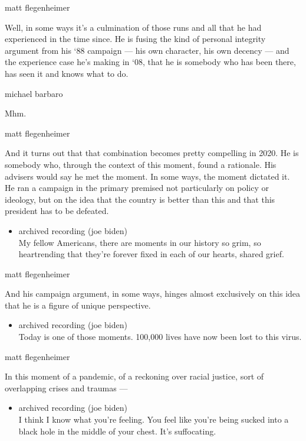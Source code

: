 matt flegenheimer

Well, in some ways it's a culmination of those runs and all that he had
experienced in the time since. He is fusing the kind of personal
integrity argument from his `88 campaign --- his own character, his own
decency --- and the experience case he's making in `08, that he is
somebody who has been there, has seen it and knows what to do.

michael barbaro

Mhm.

matt flegenheimer

And it turns out that that combination becomes pretty compelling in
2020. He is somebody who, through the context of this moment, found a
rationale. His advisers would say he met the moment. In some ways, the
moment dictated it. He ran a campaign in the primary premised not
particularly on policy or ideology, but on the idea that the country is
better than this and that this president has to be defeated.

\begin{itemize}
\tightlist
\item
  archived recording (joe biden)\\
  My fellow Americans, there are moments in our history so grim, so
  heartrending that they're forever fixed in each of our hearts, shared
  grief.
\end{itemize}

matt flegenheimer

And his campaign argument, in some ways, hinges almost exclusively on
this idea that he is a figure of unique perspective.

\begin{itemize}
\tightlist
\item
  archived recording (joe biden)\\
  Today is one of those moments. 100,000 lives have now been lost to
  this virus.
\end{itemize}

matt flegenheimer

In this moment of a pandemic, of a reckoning over racial justice, sort
of overlapping crises and traumas ---

\begin{itemize}
\tightlist
\item
  archived recording (joe biden)\\
  I think I know what you're feeling. You feel like you're being sucked
  into a black hole in the middle of your chest. It's suffocating.
\end{itemize}

